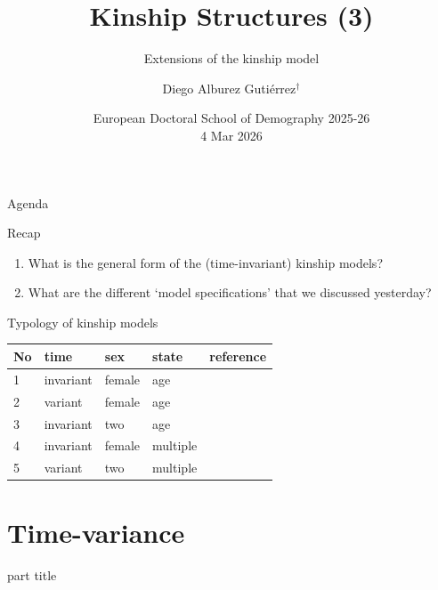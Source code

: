 ﻿\documentclass{beamer}
\title[Kinship]{Kinship Structures (3)}
\subtitle{Extensions of the kinship model}
\author{Diego Alburez Guti\'errez$^{\dagger}$}
\institute{$^{\dagger}$Kinship Inequalities Research Group, \\ Max Planck Institute for Demographic Research }
\date{European Doctoral School of Demography 2025-26 \\ 4 Mar 2026}
\begin{document}
 \begin{frame}[t,plain]
 \titlepage
 \end{frame}

 
\begin{frame}{Agenda}
\tableofcontents
\end{frame}

\begin{frame}{Recap}
    \begin{enumerate}
        \item What is the general form of the (time-invariant) kinship models?
        \item What are the different `model specifications' that we discussed yesterday?
    \end{enumerate}
\end{frame}

\begin{frame}{Typology of kinship models}

\begin{table}[]
\begin{tabular}{@{}lllll@{}}
\toprule
No & time      & sex    & state    & reference \\ \midrule
1 & invariant & female & age & \\ 
2 & variant   & female & age &  \\
3 & invariant & two   & age &  \\
4 & invariant   & female   &  multiple &  \\ 
5 & variant   & two   &  multiple & \\ \bottomrule
\end{tabular}
\end{table}

\end{frame}

\section{Time-variance}
\begin{frame}
    \begin{centering}
    \begin{beamercolorbox}[sep=12pt,center]{part title}
    \insertsection\par
    \end{beamercolorbox}
    \end{centering}
\end{frame}
\end{document}
